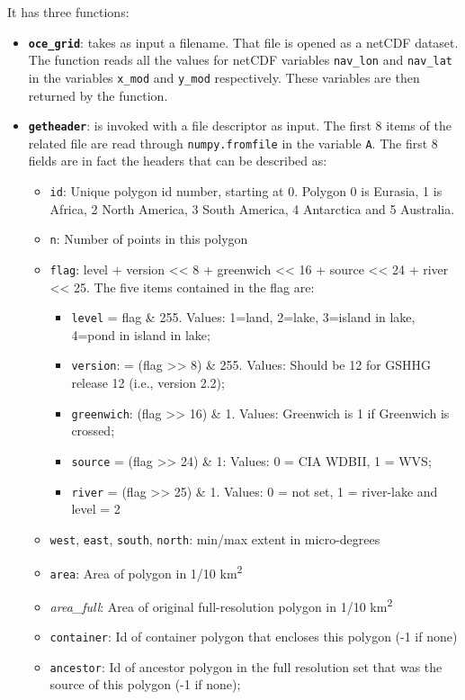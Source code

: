 It has three functions:

\begin{itemize}
    \item \textbf{\texttt{oce\_grid}}: takes as input a filename. That file is opened as a netCDF dataset. The function reads all the values for netCDF variables \texttt{nav\_lon} and \texttt{nav\_lat} in the variables \texttt{x\_mod} and \texttt{y\_mod} respectively. These variables are then returned by the function.
    
    \item \textbf{\texttt{getheader}}: is invoked with a file descriptor as input. The first 8 items of the related file are read through \texttt{numpy.fromfile} in the variable \texttt{A}. 
    The first 8 fields are in fact the headers that can be described as:
    
    \begin{itemize}
        \item \texttt{id}: Unique polygon id number, starting at 0. Polygon 0 is Eurasia, 1 is Africa, 2 North America, 3 South America, 4 Antarctica and 5 Australia.

        \item \texttt{n}: Number of points in this polygon
        \item \texttt{flag}: level + version << 8 + greenwich << 16 + source << 24 + river << 25. The five items contained in the flag are:
        \begin{itemize}
            \item \texttt{level} = flag \& 255. Values: 1=land, 2=lake, 3=island in lake, 4=pond in island in lake;
            \item \texttt{version}: = (flag >> 8) \& 255. Values: Should be 12 for GSHHG release 12 (i.e., version 2.2);
            \item \texttt{greenwich}: (flag >> 16) \& 1. Values: Greenwich is 1 if Greenwich is crossed;
            \item \texttt{source} = (flag >> 24) \& 1: Values: 0 = CIA WDBII, 1 = WVS;
            \item \texttt{river} = (flag >> 25) \& 1. Values: 0 = not set, 1 = river-lake and level = 2
        \end{itemize}
        
        \item \texttt{west}, \texttt{east}, \texttt{south}, \texttt{north}: min/max extent in micro-degrees
        \item \texttt{area}: Area of polygon in 1/10 km\textsuperscript{2}
        \item \textit{area\_full}: Area of original full-resolution polygon in 1/10 km\textsuperscript{2}
        \item \texttt{container}: Id of container polygon that encloses this polygon (-1 if none)
        \item \texttt{ancestor}: Id of ancestor polygon in the full resolution set that was the source of this polygon (-1 if none);
    \end{itemize}
        

\end{itemize}
